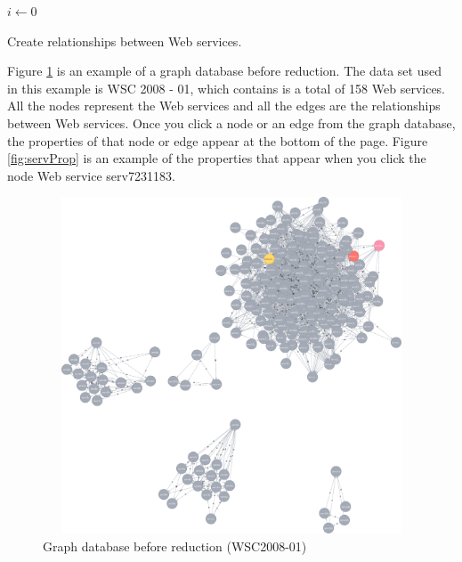 \setlength{\textfloatsep}{20pt}%
\begin{algorithm}[H]
 \LinesNumbered
 \SetNlSty{}{}{:}
 $i \leftarrow 0$\;
 \caption{\footnotesize Create relationships between Web services.}
\label{generation}
\end{algorithm}
\setlength{\textfloatsep}{20pt}%

\begin{exmp}
Figure \ref{fig:beforeReduction} is an example of a graph database before reduction. The data set used in this example is WSC 2008 - 01, which contains is a total of 158 Web services. All the nodes represent the Web services and all the edges are the relationships between Web services. Once you click a node or an edge from the graph database, the properties of that node or edge appear at the bottom of the page. Figure \ref{fig:servProp} is an example of the properties that appear when you click the node Web service serv7231183. \par
\end{exmp}

\begin{figure}[H]
\includegraphics[width = 13cm, height = 10cm, scale = 0.5]{svg-before-reduce.pdf}
\centering
\caption{Graph database before reduction (WSC2008-01)}
\label{fig:beforeReduction} 
\end{figure} 

